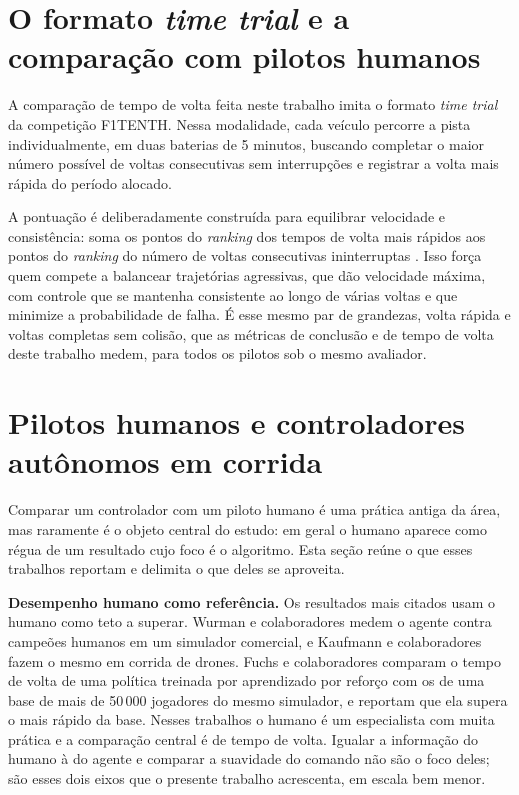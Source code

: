 \section{O formato \textit{time trial} e a comparação com pilotos humanos}\label{sec:arte-timetrial}

A comparação de tempo de volta feita neste trabalho imita o formato \textit{time
trial} da competição F1TENTH. Nessa modalidade, cada veículo percorre a pista
individualmente, em duas baterias de 5 minutos, buscando completar o maior número
possível de voltas consecutivas sem interrupções e registrar a volta mais rápida
do período alocado.

A pontuação é deliberadamente construída para equilibrar velocidade e
consistência: soma os pontos do \emph{ranking} dos tempos de volta mais rápidos
aos pontos do \emph{ranking} do número de voltas consecutivas ininterruptas
\cite{F1TENTHRules2023}. Isso força quem compete a balancear trajetórias
agressivas, que dão velocidade máxima, com controle que se mantenha consistente
ao longo de várias voltas e que minimize a probabilidade de falha. É esse mesmo
par de grandezas, volta rápida e voltas completas sem colisão, que as métricas de
conclusão e de tempo de volta deste trabalho medem, para todos os pilotos sob o
mesmo avaliador.

\section{Pilotos humanos e controladores autônomos em corrida}\label{sec:arte-humanos}

Comparar um controlador com um piloto humano é uma prática antiga da área, mas
raramente é o objeto central do estudo: em geral o humano aparece como régua de
um resultado cujo foco é o algoritmo. Esta seção reúne o que esses trabalhos
reportam e delimita o que deles se aproveita.

\textbf{Desempenho humano como referência.} Os resultados mais citados usam o
humano como teto a superar. Wurman e colaboradores \cite{Wurman2022GranTurismo}
medem o agente contra campeões humanos em um simulador comercial, e Kaufmann e
colaboradores \cite{Kaufmann2023DroneRacing} fazem o mesmo em corrida de drones.
Fuchs e colaboradores \cite{Fuchs2021SuperHuman} comparam o tempo de volta de uma
política treinada por aprendizado por reforço com os de uma base de mais de
50\,000 jogadores do mesmo simulador, e reportam que ela supera o mais rápido da
base. Nesses trabalhos o humano é um especialista com muita prática e a comparação
central é de tempo de volta. Igualar a informação do humano à do agente e comparar a
suavidade do comando não são o foco deles; são esses dois eixos que o presente
trabalho acrescenta, em escala bem menor.

